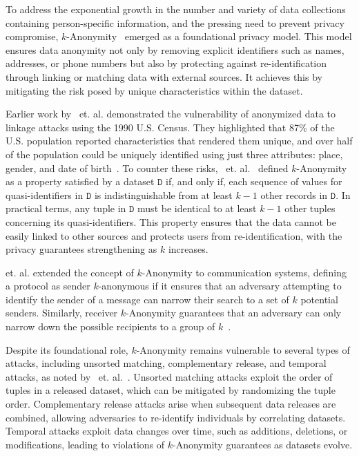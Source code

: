 To address the exponential growth in the number and variety of data collections containing person-specific information, and the pressing need to prevent privacy compromise, \(k\)-Anonymity~\cite{KAnonSweeney} emerged as a foundational privacy model. This model ensures data anonymity not only by removing explicit identifiers such as names, addresses, or phone numbers but also by protecting against re-identification through linking or matching data with external sources. It achieves this by mitigating the risk posed by unique characteristics within the dataset.

Earlier work by~\citeauthor{KAnonSweeney} et. al. demonstrated the vulnerability of anonymized data to linkage attacks using the 1990 U.S. Census. They highlighted that 87\% of the U.S. population reported characteristics that rendered them unique, and over half of the population could be uniquely identified using just three attributes: place, gender, and date of birth~\cite{IdentifyPeopleSweeney}. To counter these risks,~\citeauthor{KAnonSweeney} et. al.~\cite{KAnonSweeney} defined \(k\)-Anonymity as a property satisfied by a dataset \(\texttt{D}\) if, and only if, each sequence of values for quasi-identifiers in \(\texttt{D}\) is indistinguishable from at least \(k-1\) other records in \(\texttt{D}\). In practical terms, any tuple in \(\texttt{D}\) must be identical to at least \(k-1\) other tuples concerning its quasi-identifiers. This property ensures that the data cannot be easily linked to other sources and protects users from re-identification, with the privacy guarantees strengthening as \(k\) increases.

\citeauthor{KAnoMsgTrans} et. al. extended the concept of \(k\)-Anonymity to communication systems, defining a protocol as sender \(k\)-anonymous if it ensures that an adversary attempting to identify the sender of a message can narrow their search to a set of \(k\) potential senders. Similarly, receiver \(k\)-Anonymity guarantees that an adversary can only narrow down the possible recipients to a group of \(k\)~\cite{KAnoMsgTrans}.

Despite its foundational role, \(k\)-Anonymity remains vulnerable to several types of attacks, including unsorted matching, complementary release, and temporal attacks, as noted by~\citeauthor{KAnonSweeney} et. al.~\cite{KAnonSweeney}. Unsorted matching attacks exploit the order of tuples in a released dataset, which can be mitigated by randomizing the tuple order. Complementary release attacks arise when subsequent data releases are combined, allowing adversaries to re-identify individuals by correlating datasets. Temporal attacks exploit data changes over time, such as additions, deletions, or modifications, leading to violations of \(k\)-Anonymity guarantees as datasets evolve.

